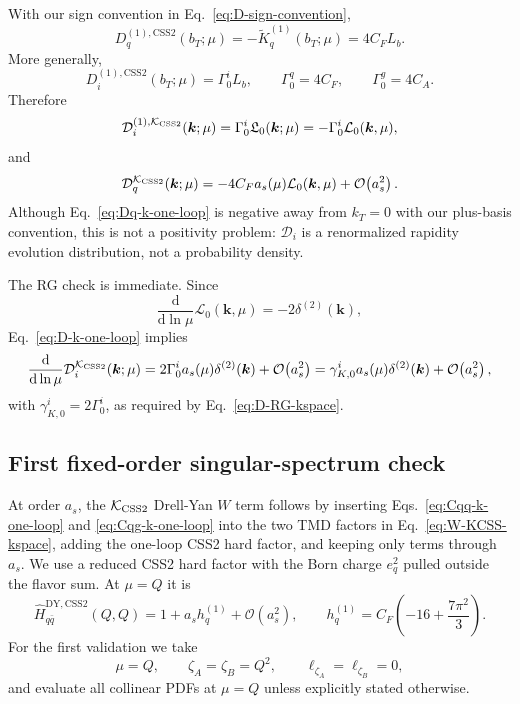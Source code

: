 \documentclass[11pt]{article}
\newcommand{\bk}{\bm{k}}
\newcommand{\dd}{\mathrm{d}}
\newcommand{\deltaT}{\delta^{(2)}}
\newcommand{\order}[1]{\mathcal{O}\!\left(#1\right)}
\newcommand{\DY}{\mathrm{DY}}
\newcommand{\KCSS}{\mathcal K_{\rm CSS2}}
\newcommand{\CSS}{\mathrm{CSS2}}
\begin{document}
With our sign convention in Eq.~\eqref{eq:D-sign-convention},
\begin{equation}
  D_q^{(1),\CSS}(b_T;\mu)=-\widetilde K_q^{(1)}(b_T;\mu)=4C_F L_b.
  \label{eq:Dq-b-one-loop}
\end{equation}
More generally,
\begin{equation}
  D_i^{(1),\CSS}(b_T;\mu)=\Gamma_0^i L_b,
  \qquad
  \Gamma_0^q=4C_F,
  \qquad
  \Gamma_0^g=4C_A.
  \label{eq:Di-b-one-loop}
\end{equation}
Therefore
\begin{equation}
  \mathcal D_i^{(1),\KCSS}(\bk;\mu)
  =\Gamma_0^i\mathfrak L_0(\bk;\mu)
  =-\Gamma_0^i\mathcal L_0(\bk,\mu),
  \label{eq:D-k-one-loop}
\end{equation}
and
\begin{equation}
  \mathcal D_q^{\KCSS}(\bk;\mu)
  =-4C_F a_s(\mu)\mathcal L_0(\bk,\mu)+\order{a_s^2}.
  \label{eq:Dq-k-one-loop}
\end{equation}
Although Eq.~\eqref{eq:Dq-k-one-loop} is negative away from $k_T=0$ with our plus-basis
convention, this is not a positivity problem: $\mathcal D_i$ is a renormalized rapidity
evolution distribution, not a probability density.

The RG check is immediate. Since
\begin{equation}
  \frac{\dd}{\dd\ln\mu}\mathcal L_0(\bk,\mu)=-2\deltaT(\bk),
\end{equation}
Eq.~\eqref{eq:D-k-one-loop} implies
\begin{equation}
  \frac{\dd}{\dd\ln\mu}\mathcal D_i^{\KCSS}(\bk;\mu)
  =2\Gamma_0^i a_s(\mu)\deltaT(\bk)+\order{a_s^2}
  =\gamma_{K,0}^i a_s(\mu)\deltaT(\bk)+\order{a_s^2},
  \label{eq:D-k-RG-check}
\end{equation}
with $\gamma_{K,0}^i=2\Gamma_0^i$, as required by Eq.~\eqref{eq:D-RG-kspace}.

\subsection{First fixed-order singular-spectrum check}
\label{subsec:first-singular-spectrum}

At order $a_s$, the $\KCSS$ Drell-Yan $W$ term follows by inserting
Eqs.~\eqref{eq:Cqq-k-one-loop} and \eqref{eq:Cqg-k-one-loop} into the two TMD factors in
Eq.~\eqref{eq:W-KCSS-kspace}, adding the one-loop CSS2 hard factor, and keeping only
terms through $a_s$. We use a reduced CSS2 hard factor with the Born charge $e_q^2$ pulled outside the flavor sum. At $\mu=Q$ it is~\cite{CollinsRogers2017}
\begin{equation}
  \widehat H_{q\bar q}^{\DY,\CSS}(Q,Q)
  = 1+a_s h_q^{(1)}+\order{a_s^2},
  \qquad
  h_q^{(1)}=C_F\left(-16+\frac{7\pi^2}{3}\right).
  \label{eq:hard-one-loop-dy}
\end{equation}
For the first validation we take
\begin{equation}
  \mu=Q,
  \qquad
  \zeta_A=\zeta_B=Q^2,
  \qquad
  \ell_{\zeta_A}=\ell_{\zeta_B}=0,
  \label{eq:validation-scales}
\end{equation}
and evaluate all collinear PDFs at $\mu=Q$ unless explicitly stated otherwise.
\end{document}

